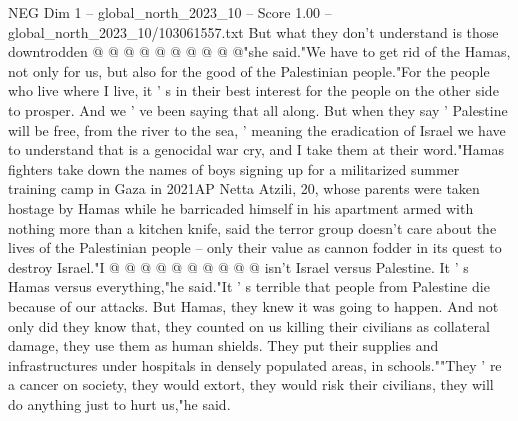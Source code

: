 \begin{textsample}{NEG Dim 1 – global\_north\_2023\_10 – Score 1.00 – global\_north\_2023\_10/103061557.txt}
But what they don't understand is those downtrodden @ @ @ @ @ @ @ @ @ @"she said."We have to get rid of the Hamas, not only for us, but also for the good of the Palestinian people."For the people who live where I live, it ' s in their best interest for the people on the other side to prosper.
And we ' ve been saying that all along.
But when they say ' Palestine will be free, from the river to the sea, ' meaning the eradication of Israel we have to understand that is a genocidal war cry, and I take them at their word."Hamas fighters take down the names of boys signing up for a militarized summer training camp in Gaza in 2021AP Netta Atzili, 20, whose parents were taken hostage by Hamas while he barricaded himself in his apartment armed with nothing more than a kitchen knife, said the terror group doesn't care about the lives of the Palestinian people -- only their value as cannon fodder in its quest to destroy Israel."I @ @ @ @ @ @ @ @ @ @ isn't Israel versus Palestine.
It ' s Hamas versus everything,"he said."It ' s terrible that people from Palestine die because of our attacks.
But Hamas, they knew it was going to happen.
And not only did they know that, they counted on us killing their civilians as collateral damage, they use them as human shields.
They put their supplies and infrastructures under hospitals in densely populated areas, in schools.""They ' re a cancer on society, they would extort, they would risk their civilians, they will do anything just to hurt us,"he said.

\end{textsample}
